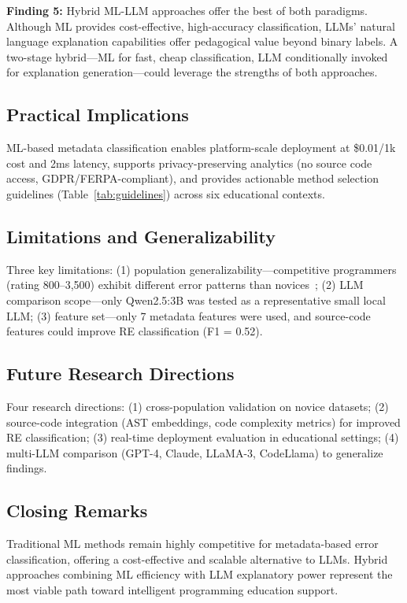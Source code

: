 \documentclass[acmsmall]{acmart}
\begin{document}
\textbf{Finding 5:} Hybrid ML-LLM approaches offer the best of both paradigms.
Although ML provides cost-effective, high-accuracy classification, LLMs'
natural language explanation capabilities offer pedagogical value beyond
binary labels. A two-stage hybrid---ML for fast, cheap classification, LLM
conditionally invoked for explanation generation---could leverage the
strengths of both approaches.

\subsection*{Practical Implications}
ML-based metadata classification enables platform-scale deployment at
\$0.01/1k cost and 2ms latency, supports privacy-preserving analytics (no
source code access, GDPR/FERPA-compliant), and provides actionable method
selection guidelines (Table~\ref{tab:guidelines}) across six educational
contexts.

\subsection*{Limitations and Generalizability}
Three key limitations: (1) population generalizability---competitive
programmers (rating 800--3,500) exhibit different error patterns than
novices~\cite{lee2022cs1qa,brown2014blackbox}; (2) LLM comparison
scope---only Qwen2.5:3B was tested as a representative small local LLM; (3) feature
set---only 7 metadata features were used, and source-code features could
improve RE classification (F1 = 0.52).

\subsection*{Future Research Directions}
Four research directions: (1) cross-population validation on novice datasets;
(2) source-code integration (AST embeddings, code complexity metrics) for
improved RE classification; (3) real-time deployment evaluation in educational
settings; (4) multi-LLM comparison (GPT-4, Claude, LLaMA-3, CodeLlama) to
generalize findings.

\subsection*{Closing Remarks}
Traditional ML methods remain highly competitive for metadata-based error
classification, offering a cost-effective and scalable alternative to LLMs.
Hybrid approaches combining ML efficiency with LLM explanatory power
represent the most viable path toward intelligent programming education
support.
\end{document}
